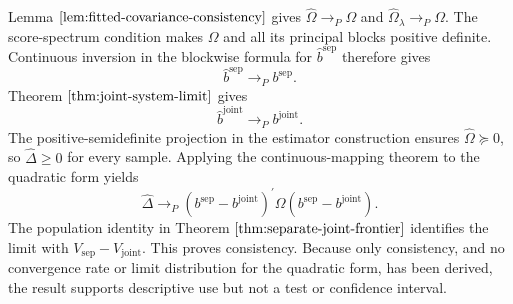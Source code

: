 Lemma \(\ref{lem:fitted-covariance-consistency}\) gives \(\widehat\Omega\to_P\Omega\) and \(\widehat\Omega_{\lambda}\to_P\Omega\). The score-spectrum condition makes \(\Omega\) and all its principal blocks positive definite. Continuous inversion in the blockwise formula for \(\widehat b^{\mathrm{sep}}\) therefore gives
\[
\widehat b^{\mathrm{sep}}\to_Pb^{\mathrm{sep}}.
\]
Theorem \(\ref{thm:joint-system-limit}\) gives
\[
\widehat b^{\mathrm{joint}}\to_Pb^{\mathrm{joint}}.
\]
The positive-semidefinite projection in the estimator construction ensures \(\widehat\Omega\succeq0\), so \(\widehat\Delta\ge0\) for every sample. Applying the continuous-mapping theorem to the quadratic form yields
\[
\widehat\Delta
\to_P
(b^{\mathrm{sep}}-b^{\mathrm{joint}})^{\prime}
\Omega(b^{\mathrm{sep}}-b^{\mathrm{joint}}).
\]
The population identity in Theorem \(\ref{thm:separate-joint-frontier}\) identifies the limit with \(V_{\mathrm{sep}}-V_{\mathrm{joint}}\). This proves consistency. Because only consistency, and no convergence rate or limit distribution for the quadratic form, has been derived, the result supports descriptive use but not a test or confidence interval.